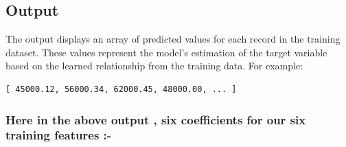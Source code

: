 \documentclass[11pt]{article}
\begin{document}
\subsection*{Output}
The output displays an array of predicted values for each record in the training dataset. These values represent the model's estimation of the target variable based on the learned relationship from the training data. For example:

\begin{verbatim}
[ 45000.12, 56000.34, 62000.45, 48000.00, ... ]
\end{verbatim}
      
\subsubsection*{Here in the above output , six coefficients for our six training features :-}
\newpage
\end{document}
